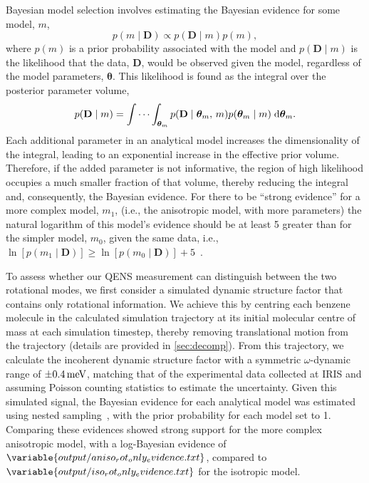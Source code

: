 \documentclass[reprint,
               superscriptaddress,
               nobibnotes,
               amsmath,
               amssymb,
               aps,
               hidelinks, 
               pre]{revtex4-2}
\newcommand{\pr}[2]{p(#1\mid#2)}
\begin{document}
Bayesian model selection involves estimating the Bayesian evidence for some model, $m$, 
%
\begin{equation}
    \pr{m}{\mathbf{D}} \propto \pr{\mathbf{D}}{m}p(m),
\end{equation}
%
where $p(m)$ is a prior probability associated with the model and $\pr{\mathbf{D}}{m}$ is the likelihood that the data, $\mathbf{D}$, would be observed given the model, regardless of the model parameters, $\bm{\theta}$. 
This likelihood is found as the integral over the posterior parameter volume,
%
\begin{equation}
    \pr{\mathbf{D}}{m} = \idotsint_{\bm{\theta}_m} \pr{\mathbf{D}}{\bm{\theta}_m,\,m}\pr{\bm{\theta}_m}{m}\;\mathrm{d}\bm{\theta}_m.
    \label{eqn:inte}
\end{equation}
%
Each additional parameter in an analytical model increases the dimensionality of the integral, leading to an exponential increase in the effective prior volume. 
Therefore, if the added parameter is not informative, the region of high likelihood occupies a much smaller fraction of that volume, thereby reducing the integral and, consequently, the Bayesian evidence.
For there to be ``strong evidence'' for a more complex model, $m_1$, (i.e., the anisotropic model, with more parameters) the natural logarithm of this model's evidence should be at least \num{5} greater than for the simpler model, $m_0$, given the same data, i.e., $\ln\left[\pr{m_1}{\mathbf{D}}\right] \geq \ln\left[\pr{m_0}{\mathbf{D}}\right] + 5$~\cite{Kass1995}. 

To assess whether our QENS measurement can distinguish between the two rotational modes, we first consider a simulated dynamic structure factor that contains only rotational information. 
We achieve this by centring each benzene molecule in the calculated simulation trajectory at its initial molecular centre of mass at each simulation timestep, thereby removing translational motion from the trajectory (details are provided in \ref{sec:decomp}).
From this trajectory, we calculate the incoherent dynamic structure factor with a symmetric $\omega$-dynamic range of $\qty{\pm0.4}{\milli\electronvolt}$, matching that of the experimental data collected at IRIS and assuming Poisson counting statistics to estimate the uncertainty. 
Given this simulated signal, the Bayesian evidence for each analytical model was estimated using nested sampling~\cite{Skilling2004}, with the prior probability for each model set to \num{1}. 
Comparing these evidences showed strong support for the more complex anisotropic model, with a log-Bayesian evidence of $\variable{output/aniso_rot_only_evidence.txt}$, compared to $\variable{output/iso_rot_only_evidence.txt}$ for the isotropic model. 
\end{document}
